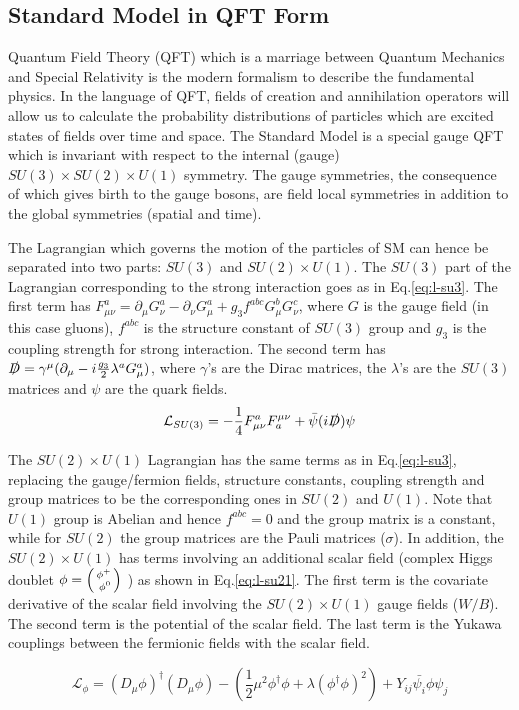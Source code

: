 \subsection{Standard Model in QFT Form}

Quantum Field Theory (QFT) which is a marriage between Quantum Mechanics and Special Relativity is the modern formalism to describe the fundamental physics. In the language of QFT, fields of creation and annihilation operators will allow us to calculate the probability distributions of particles which are excited states of fields over time and space. The Standard Model is a special gauge QFT which is invariant with respect to the internal (gauge) $SU(3)\times SU(2)\times U(1)$ symmetry. The gauge symmetries, the consequence of which gives birth to the gauge bosons, are field local symmetries in addition to the global symmetries (spatial and time). 

The Lagrangian which governs the motion of the particles of SM can hence be separated into two parts: $SU(3)$ and $SU(2)\times U(1)$. The $SU(3)$ part of the Lagrangian corresponding to the strong interaction goes as in Eq.\ref{eq:l-su3}. The first term has $F^{a}_{\mu\nu}  = \partial_{\mu}G^a_{\nu}-\partial_{\nu}G^a_{\mu}+g_3f^{abc}G^b_{\mu}G^c_{\nu}$, where $G$ is the gauge field (in this case gluons), $f^{abc}$ is the structure constant of $SU(3)$ group and $g_3$ is the coupling strength for strong interaction. The second term has $\slashed{D} = \gamma^{\mu}(\partial_{\mu}- i\frac{g_3}{2}\lambda^aG^a_{\mu})$, where $\gamma$'s are the Dirac matrices, the $\lambda$'s are the $SU(3)$ matrices and $\psi$ are the quark fields. 
\begin{equation}
  \mathcal{L}_{SU(3)} = -\frac{1}{4}F^{a}_{\mu\nu}F_{a}^{\mu\nu}+ \bar{\psi}(i\slashed{D}) \psi
  \label{eq:l-su3}
\end{equation}

The $SU(2)\times U(1)$ Lagrangian has the same terms as in Eq.\ref{eq:l-su3}, replacing the gauge/fermion fields, structure constants, coupling strength and group matrices to be the corresponding ones in $SU(2)$ and $U(1)$. Note that $U(1)$ group is Abelian and hence $f^{abc}=0$ and the group matrix is a constant, while for $SU(2)$ the group matrices are the Pauli matrices ($\sigma$). In addition, the $SU(2)\times U(1)$ has terms involving an additional scalar field (complex Higgs doublet $\phi = \begin{psmallmatrix*}[r] \phi^+ \\ \phi^0 \end{psmallmatrix*} $ ) as shown in Eq.\ref{eq:l-su21}. The first term is the covariate derivative of the scalar field involving the $SU(2)\times U(1)$ gauge fields ($W/B$). The second term is the potential of the scalar field. The last term is the Yukawa couplings between the fermionic fields with the scalar field. 

\begin{equation}
  \mathcal{L}_{\phi} = (D_{\mu}\phi)^{\dagger}(D_{\mu}\phi)-(\frac{1}{2}\mu^2\phi^{\dagger}\phi+\lambda(\phi^{\dagger}\phi )^2)+Y_{ij}\bar{\psi_i}\phi\psi_j
  \label{eq:l-su21}
\end{equation}


